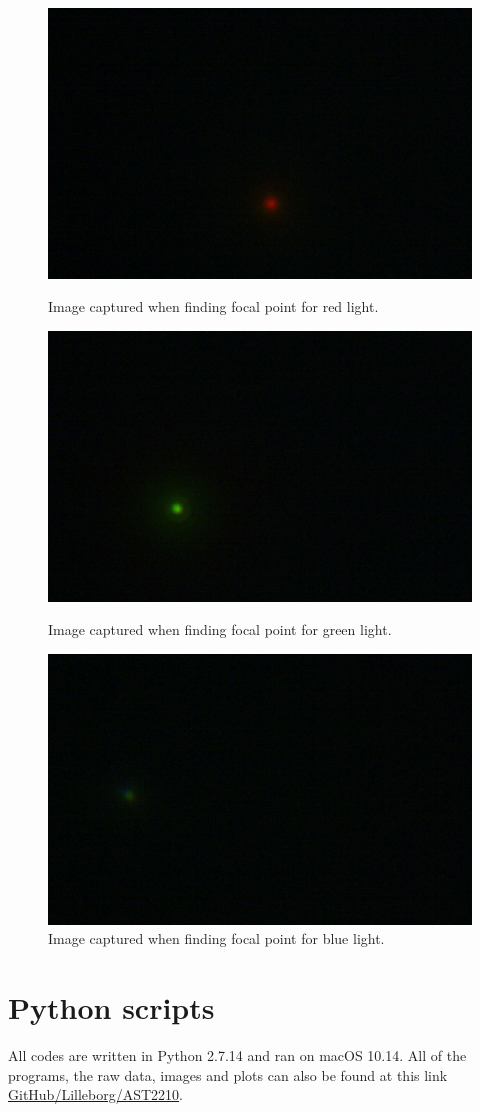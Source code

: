 \documentclass{emulateapj}
\begin{document}
\begin{appendices}
\begin{figure}[h!]
	\begin{minipage}{.33\textwidth}
	\centering
	\includegraphics[width=0.7\linewidth]{./images/ex2/cali_red.pdf}
	\caption{Image captured when finding focal point for red light.}
	\end{minipage}%
	\begin{minipage}{.33\textwidth}
	\centering
	\includegraphics[width=0.55\linewidth]{./images/ex2/cali_green.pdf}
		\caption{Image captured when finding focal point for green light.}
	\end{minipage}%
	\begin{minipage}{.33\textwidth}
	\centering
	\includegraphics[width=0.6\linewidth]{./images/ex2/cali_blue.pdf}
		\caption{Image captured when finding focal point for blue light.}
	\end{minipage}
\end{figure}
\clearpage

\section{Python scripts}
\label{asec: Python scripts}
All codes are written in Python 2.7.14 and ran on macOS 10.14. All of the programs, the raw data, images and plots can also be found at this link \href{https://github.com/Lilleborg/AST2210-Observational-Astrpnomy/tree/master/Project2}{GitHub/Lilleborg/AST2210}.

\end{appendices}
\end{document}
